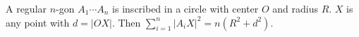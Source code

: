 A regular $n$-gon $A_1 \cdots A_n$ is inscribed in a circle with center $O$ and radius $R$. $X$ is any point with $d = |OX|$. Then $\sum_{i=1}^n |A_iX|^2 = n(R^2 + d^2)$.
